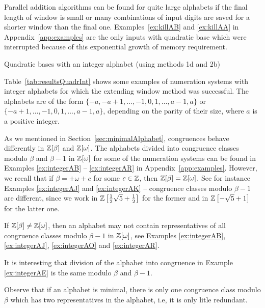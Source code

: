 Parallel addition algorithms can be found for quite large alphabets  if the final length of window is small or many combinations of input digits  are saved for a shorter window than the final one. Examples~\ref{ex:killAB} and \ref{ex:killAA} in Appendix~\ref{app:examples} are the only inputs with quadratic base which were interrupted because of this exponential growth of memory requirement.

 
\begin{table}[htpb]
	\begin{center}
	
	\end{center}
\caption{Quadratic bases with an integer alphabet (using methods 1d and 2b)}
\label{tab:resultsQuadrInt}
\end{table}

Table~\ref{tab:resultsQuadrInt} shows some examples of numeration systems with integer alphabets for which the extending window method was successful. The alphabets are of the form $\{-a, -a+1, \dots, -1,0,1,\dots, a-1,a\}$ or $\{-a+1, \dots, -1,0,1,\dots, a-1,a\}$, depending on the parity of their size, where $a$ is a positive integer.

As we mentioned in Section~\ref{sec:minimalAlphabet}, congruences behave differently in $\mathbb{Z}[\beta]$ and $\mathbb{Z}[\omega]$. The alphabets divided into congruence classes modulo $\beta$ and $\beta-1$ in $\mathbb{Z}[\omega]$ for some of the numeration systems can be found in Examples \ref{ex:integerAB} -- \ref{ex:integerAR} in Appendix~\ref{app:examples}. However, we recall that if $\beta=\pm \omega+c$  for some $c\in\mathbb{Z}$, then $\mathbb{Z}[\beta]=\mathbb{Z}[\omega]$. See for instance Examples \ref{ex:integerAJ} and \ref{ex:integerAK} -- congruence classes modulo $\beta-1$ are different, since we work in $\mathbb{Z}\left[\frac{1}{2} \sqrt{5} + \frac{1}{2}\right]$ for the former and in $\mathbb{Z}\left[-\sqrt{5} + 1\right]$ for the latter one.

If $\mathbb{Z}[\beta]\neq\mathbb{Z}[\omega]$, then an alphabet may not contain representatives of all congruence classes modulo $\beta-1$ in $\mathbb{Z}[\omega]$, see Examples \ref{ex:integerAB},  \ref{ex:integerAJ}, \ref{ex:integerAO} and \ref{ex:integerAR}.

It is interesting that division of the alphabet into congruence in Example \ref{ex:integerAE} is the same modulo $\beta$ and $\beta-1$.

Observe that if an alphabet is minimal, there is only one congruence class modulo $\beta$ which has two representatives in the alphabet, i.e, it is only litle  redundant.

